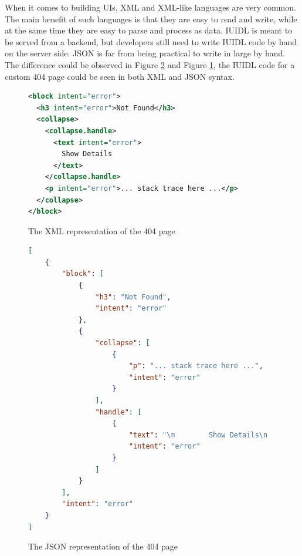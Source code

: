 When it comes to building UIs, XML and XML-like languages are very common. The main benefit of such languages is that they are easy to read and write, while at the same time they are easy to parse and process as data. IUIDL is meant to be served from a backend, but developers still need to write IUIDL code by hand on the server side. JSON is far from being practical to write in large by hand. The difference could be observed in Figure \ref{fig:syntax_json} and Figure \ref{fig:syntax_xml}, the IUIDL code for a custom 404 page could be seen in both XML and JSON syntax.

\begin{figure}
\begin{minipage}{\linewidth}
\begin{lstlisting}[language=xml]
<block intent="error">
  <h3 intent="error">Not Found</h3>
  <collapse>
    <collapse.handle>
      <text intent="error">
        Show Details
      </text>
    </collapse.handle>
    <p intent="error">... stack trace here ...</p>
  </collapse>
</block>
\end{lstlisting}
\end{minipage}
\caption{The XML representation of the 404 page}%
\label{fig:syntax_xml}%
\end{figure}

\begin{figure}
\begin{minipage}{\linewidth}
\begin{lstlisting}[language=json]
[
    {
        "block": [
            {
                "h3": "Not Found",
                "intent": "error"
            },
            {
                "collapse": [
                    {
                        "p": "... stack trace here ...",
                        "intent": "error"
                    }
                ],
                "handle": [
                    {
                        "text": "\n        Show Details\n      ",
                        "intent": "error"
                    }
                ]
            }
        ],
        "intent": "error"
    }
]
\end{lstlisting}
\end{minipage}
\caption{The JSON representation of the 404 page}%
\label{fig:syntax_json}%
\end{figure}


